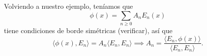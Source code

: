 \documentclass[../edp.tex]{subfiles}
\begin{document}
Volviendo a nuestro ejemplo, teníamos que
\begin{displaymath}
	\phi(x)
	=
	\sum_{n\ge 0} A_n E_n(x)
\end{displaymath}
tiene condiciones de borde simétricas (verificar), así que
\begin{displaymath}
	\langle \phi(x), E_n \rangle
	=
	A_n \langle E_n, E_n \rangle
	\implies
	A_n
	=
	\frac
	{\langle E_n, \phi(x) \rangle}
	{\langle E_n, E_n \rangle}.
\end{displaymath}
\end{document}
